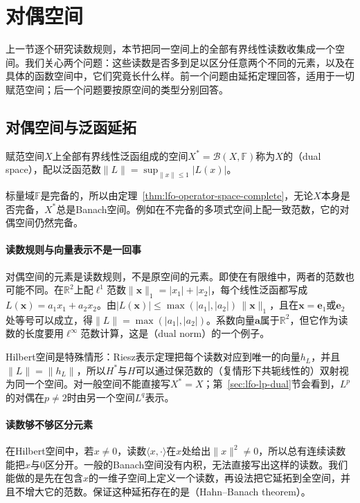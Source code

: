 
\section{对偶空间}
\label{sec:lfo-dual}

上一节逐个研究读数规则，本节把同一空间上的全部有界线性读数收集成一个空间。我们关心两个问题：这些读数是否多到足以区分任意两个不同的元素，以及在具体的函数空间中，它们究竟长什么样。前一个问题由延拓定理回答，适用于一切赋范空间；后一个问题要按原空间的类型分别回答。

\subsection{对偶空间与泛函延拓}
\label{sec:lfo-hahn-banach}

\begin{definition}[对偶空间]
\label{def:lfo-dual-space}
赋范空间$X$上全部有界线性泛函组成的空间$X^*=\mathcal B(X,\mathbb F)$称为$X$的（dual space），配以泛函范数$\|L\|=\sup_{\|x\|\leq1}|L(x)|$。
\end{definition}

标量域$\mathbb F$是完备的，所以由定理~\ref{thm:lfo-operator-space-complete}，无论$X$本身是否完备，$X^*$总是Banach空间。例如在不完备的多项式空间上配一致范数，它的对偶空间仍然完备。

\paragraph{读数规则与向量表示不是一回事}
对偶空间的元素是读数规则，不是原空间的元素。即使在有限维中，两者的范数也可能不同。在$\mathbb R^2$上配$\ell^1$范数$\|\bm x\|_1=|x_1|+|x_2|$，每个线性泛函都写成$L(\bm x)=a_1x_1+a_2x_2$。由$|L(\bm x)|\leq\max(|a_1|,|a_2|)\,\|\bm x\|_1$，且在$\bm x=\bm e_1$或$\bm e_2$处等号可以成立，得$\|L\|=\max(|a_1|,|a_2|)$。系数向量$\bm a$属于$\mathbb R^2$，但它作为读数的长度要用$\ell^\infty$范数计算，这是（dual norm）的一个例子。

Hilbert空间是特殊情形：Riesz表示定理把每个读数对应到唯一的向量$h_L$，并且$\|L\|=\|h_L\|$，所以$H^*$与$H$可以通过保范数的（复情形下共轭线性的）双射视为同一个空间。对一般空间不能直接写$X^*=X$；第~\ref{sec:lfo-lp-dual}节会看到，$L^p$的对偶在$p\neq2$时由另一个空间$L^q$表示。

\paragraph{读数够不够区分元素}
在Hilbert空间中，若$x\neq0$，读数$\langle x,\cdot\rangle$在$x$处给出$\|x\|^2\neq0$，所以总有连续读数能把$x$与$0$区分开。一般的Banach空间没有内积，无法直接写出这样的读数。我们能做的是先在包含$x$的一维子空间上定义一个读数，再设法把它延拓到全空间，并且不增大它的范数。保证这种延拓存在的是（Hahn--Banach theorem）。

